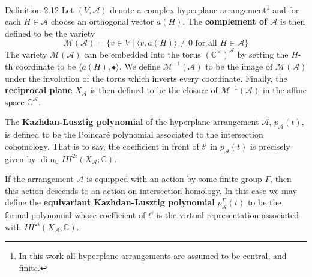 \begin{sourceblock}{Definition 2.12}
Let $(V,\mathcal{A})$ denote a complex hyperplane arrangement\footnote{In this work all hyperplane arrangements are assumed to be central, and finite.} and for each $H\in\mathcal{A}$ choose an orthogonal vector $a(H)$. The \textbf{complement of $\mathcal{A}$} is then defined to be the variety
\[
 \mathcal{M}(\mathcal{A})=\{v\in V\mid\langle v,a(H)\rangle\neq0\text{ for all }H\in\mathcal{A}\}
\]
The variety $\mathcal{M}(\mathcal{A})$ can be embedded into the torus $(\mathbb{C}^\times)^{\mathcal{A}}$ by setting the $H$-th coordinate to be $\langle a(H),\bullet\rangle$. We define $\mathcal{M}^{-1}(\mathcal{A})$ to be the image of $\mathcal{M}(\mathcal{A})$ under the involution of the torus which inverts every coordinate. Finally, the \textbf{reciprocal plane} $X_{\mathcal{A}}$ is then defined to be the closure of $\mathcal{M}^{-1}(\mathcal{A})$ in the affine space $\mathbb{C}^{\mathcal{A}}$.

The \textbf{Kazhdan-Lusztig polynomial} of the hyperplane arrangement $\mathcal{A}$, $p_{\mathcal{A}}(t)$, is defined to be the Poincar\'e polynomial associated to the intersection cohomology. That is to say, the coefficient in front of $t^i$ in $p_{\mathcal{A}}(t)$ is precisely given by $\dim_{\mathbb{C}}IH^{2i}(X_{\mathcal{A}};\mathbb{C})$.

If the arrangement $\mathcal{A}$ is equipped with an action by some finite group $\Gamma$, then this action descends to an action on intersection homology. In this case we may define the \textbf{equivariant Kazhdan-Lusztig polynomial} $p_{\mathcal{A}}^\Gamma(t)$ to be the formal polynomial whose coefficient of $t^i$ is the virtual representation associated with $IH^{2i}(X_{\mathcal{A}};\mathbb{C})$.
\end{sourceblock}

